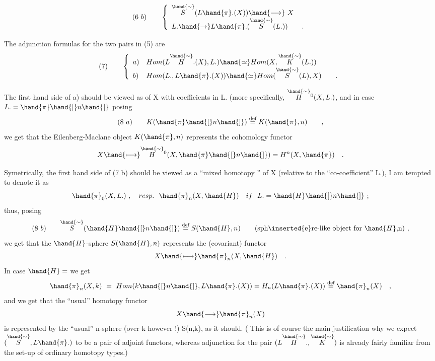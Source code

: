 \[
(6\ b)\qquad \left\{\begin{array}{l}
\overset{\hand{\sim}}{S}(L\hand{\pi}.(X)) \hand{\longrightarrow} \ X \\
L. \hand{\to} L\hand{\pi}.(\overset{\hand{\sim}}{S}(L.)) \qquad .
\end{array}\right.
\]

The adjunction formulas for the two pairs in (5) are
\[
(7)\qquad \left\{\begin{array}{ll}
a) & Hom(L\overset{\hand{\sim}}{H}.(X),L.) \hand{\simeq} Hom(X, \overset{\hand{\sim}}{K}(L.)) \\
b) & Hom(L., L\hand{\pi}.(X)) \hand{\simeq} Hom(\overset{\hand{\sim}}{S}(L),X) \qquad .
\end{array}\right.
\]

The first hand side of a) should be viewed as  of X with
coefficients in L. (more specifically,  $\overset{\hand{\sim}}{H}{}^{0}(X, L.)$, and in case $L. =\hand{\pi}\hand{[}n\hand{]}$\hand{,}
 posing
\[
(8\ a)\qquad K(\hand{\pi}\hand{[}n\hand{]}) \overset{\text{def}}{=} K(\hand{\pi},n) \qquad ,
\]
we get that the Eilenberg-Maclane object $K(\hand{\pi},n)$ represents the cohomology
functor
\[
X \hand{\longmapsto} \overset{\hand{\sim}}{H}{}^{0}(X,\hand{\pi}\hand{[}n\hand{]}) = H^{n}(X,\hand{\pi}) \quad .
\]

Symetrically, the first hand side of (7 b) should be viewed as
a ``mixed homotopy '' of X (relative to the ``co-coefficient'' L.),
I am tempted to denote it  as
\[
\hand{\pi}_{0}(X,L.)\ ,\quad resp.\ \ \hand{\pi}_{n}(X,\hand{H})\quad if\ \ L. =\hand{H}\hand{[}n\hand{]}\ ;
\]
thus, posing
\[
(8\ b)\qquad \overset{\hand{\sim}}{S}(\hand{H}\hand{[}n\hand{]}) \overset{\text{def}}{=} S(\hand{H},n) \qquad \text{(sph\inserted{e}re-like object for $\hand{H}$,n) ,}
\]
we get that the $\hand{H}$-sphere $S(\hand{H},n)$  represents the (covariant) functor 
\[
X \hand{\longmapsto} \hand{\pi}_{n}(X,\hand{H}) \quad .
\]
In case $\hand{H}=$\hand{,} we get
\[
\hand{\pi}_{n}(X,k) \ = \ Hom(k\hand{[}n\hand{]},L\hand{\pi}.(X)) = H_{n}(L\hand{\pi}.(X)) \overset{\text{def}}{=} \hand{\pi}_{n}(X) \quad ,
\]
and we get that the  ``usual'' homotopy  functor
\[
X \hand{\longrightarrow} \hand{\pi}_{n}(X)
\]
is represented by the ``usual'' n-sphere (over k however !) S(n,k), as
it should. ( This is of course the main justification why we expect
$(\overset{\hand{\sim}}{S},L\hand{\pi}.)$ to be a pair of adjoint functors, whereas adjunction for the
pair $(L\overset{\hand{\sim}}{H}.,\overset{\hand{\sim}}{K})$ is already fairly familiar from the set-up of ordinary
homotopy types.)

